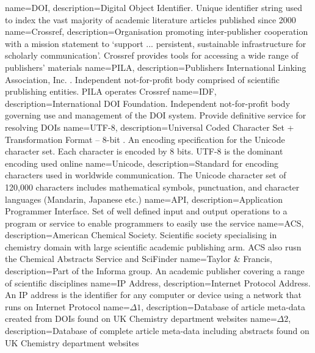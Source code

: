 {
name={DOI},
description={Digital Object Identifier. Unique identifier string used to index the vast majority of academic literature articles published since 2000 \cite{glossarydoi}} 
}
{
name={Crossref},
description={Organisation promoting inter-publisher cooperation with a mission statement to `support ... persistent, sustainable infrastructure for scholarly communication'\cite{crossref-formation}. Crossref provides tools for accessing a wide range of publishers' materials} 
}
{
name={PILA},
description={Publishers International Linking Association, Inc. . Independent not-for-profit body comprised of scientific prublishing entities. PILA operates Crossref \cite{crossref-formation}} 
}
{ 
name={IDF},
description={International DOI Foundation. Independent not-for-profit body governing use and management of the DOI system. Provide definitive service for resolving DOIs \cite{doi_handbook2}} 
}
{
name={UTF-8},
description={Universal Coded Character Set + Transformation Format – 8-bit \cite{utf8}. An encoding specification for the Unicode character set. Each character is encoded by 8 bits. UTF-8 is the dominant encoding used online \cite{utf8stats}} 
}
{
name={Unicode},
description={Standard for encoding characters used in worldwide communication. The Unicode character set of 120,000 characters includes mathematical symbols, punctuation, and character languages (Mandarin, Japanese etc.)} 
}
{
name={API},
description={Application Programmer Interface. Set of well defined input and output operations to a program or service to enable programmers to easily use the service} 
}
{
name={ACS},
description={American Chemical Society. Scientific society specialising in chemistry domain with  large scientific academic publishing arm. ACS also rusn the Chemical Abstracts Service and SciFinder\textsuperscript{\textregistered}} 
}
{
name={Taylor \& Francis},
description={Part of the Informa group. An academic publisher covering a range of scientific disciplines} 
}
{
name={IP Address},
description={Internet Protocol Address. An IP address is the identifier for any computer or device using a network that runs on Internet Protocol} 
}
{
name={$\Delta1$},
description={Database of article meta-data created from DOIs found on UK Chemistry department websites} 
}
{
name={$\Delta2$},
description={Database of complete article meta-data including abstracts found on UK Chemistry department websites} 
}
